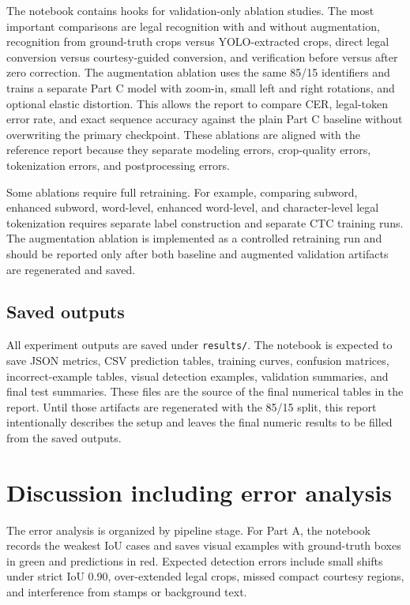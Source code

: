 \documentclass{article}
\begin{document}
The notebook contains hooks for validation-only ablation studies. The most important comparisons are legal recognition with and without augmentation, recognition from ground-truth crops versus YOLO-extracted crops, direct legal conversion versus courtesy-guided conversion, and verification before versus after zero correction. The augmentation ablation uses the same 85/15 identifiers and trains a separate Part C model with zoom-in, small left and right rotations, and optional elastic distortion. This allows the report to compare CER, legal-token error rate, and exact sequence accuracy against the plain Part C baseline without overwriting the primary checkpoint. These ablations are aligned with the reference report because they separate modeling errors, crop-quality errors, tokenization errors, and postprocessing errors.

Some ablations require full retraining. For example, comparing subword, enhanced subword, word-level, enhanced word-level, and character-level legal tokenization requires separate label construction and separate CTC training runs. The augmentation ablation is implemented as a controlled retraining run and should be reported only after both baseline and augmented validation artifacts are regenerated and saved.

\subsection{Saved outputs}

All experiment outputs are saved under \texttt{results/}. The notebook is expected to save JSON metrics, CSV prediction tables, training curves, confusion matrices, incorrect-example tables, visual detection examples, validation summaries, and final test summaries. These files are the source of the final numerical tables in the report. Until those artifacts are regenerated with the 85/15 split, this report intentionally describes the setup and leaves the final numeric results to be filled from the saved outputs.

\section{Discussion including error analysis}

The error analysis is organized by pipeline stage. For Part A, the notebook records the weakest IoU cases and saves visual examples with ground-truth boxes in green and predictions in red. Expected detection errors include small shifts under strict IoU 0.90, over-extended legal crops, missed compact courtesy regions, and interference from stamps or background text.
\end{document}
